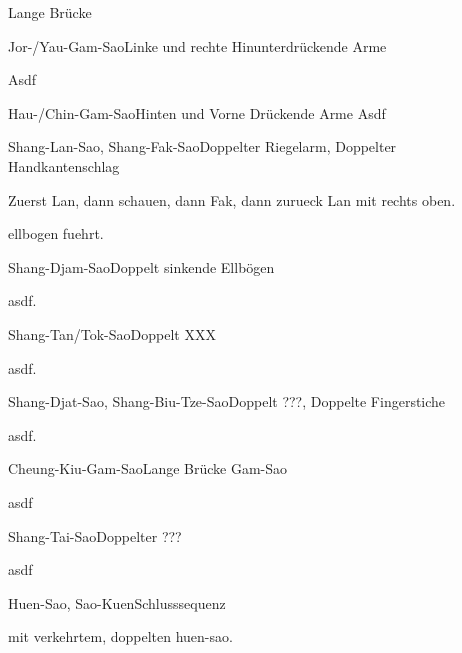 \begin{WTSatz}{Lange Br\"ucke}%
	\begin{WTSatzTeil}{Jor-/Yau-Gam-Sao}{Linke und rechte Hinunterdr\"uckende Arme}
		
		Asdf
	\end{WTSatzTeil}
	\begin{WTSatzTeil}{Hau-/Chin-Gam-Sao}{Hinten und Vorne Dr\"uckende Arme}
		Asdf
	\end{WTSatzTeil}
	\begin{WTSatzTeil}{Shang-Lan-Sao, Shang-Fak-Sao}{Doppelter Riegelarm, Doppelter Handkantenschlag}
		
		Zuerst Lan, dann schauen, dann Fak, dann zurueck Lan mit rechts oben.
		
		ellbogen fuehrt.
	\end{WTSatzTeil}
	\begin{WTSatzTeil}{Shang-Djam-Sao}{Doppelt sinkende Ellb\"ogen}
		
		asdf.
	\end{WTSatzTeil}
	\begin{WTSatzTeil}{Shang-Tan/Tok-Sao}{Doppelt XXX}
		
		asdf.
	\end{WTSatzTeil}
	\begin{WTSatzTeil}{Shang-Djat-Sao, Shang-Biu-Tze-Sao}{Doppelt ???, Doppelte Fingerstiche}
		
		asdf.
	\end{WTSatzTeil}
	\begin{WTSatzTeil}{Cheung-Kiu-Gam-Sao}{Lange Br\"ucke Gam-Sao}
		
		asdf
	\end{WTSatzTeil}
	\begin{WTSatzTeil}{Shang-Tai-Sao}{Doppelter ???}
		
		asdf
	\end{WTSatzTeil}
	\begin{WTSatzTeil}{Huen-Sao, Sao-Kuen}{Schlusssequenz}
		
		mit verkehrtem, doppelten huen-sao.
	\end{WTSatzTeil}
\end{WTSatz}

